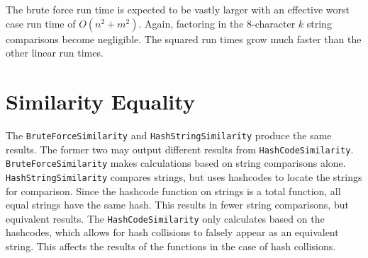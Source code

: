 \documentclass[10pt,letterpaper]{article}
\begin{document}
The brute force run time is expected to be vastly larger with an effective worst case run time of $O(n^2+m^2)$. Again, factoring in the 8-character $k$ string comparisons become negligible. The squared run times grow much faster than the other linear run times.
\section{Similarity Equality}
The \texttt{BruteForceSimilarity} and \texttt{HashStringSimilarity} produce the
same results. The former two may output different results from
\texttt{HashCodeSimilarity}. \texttt{BruteForceSimilarity} makes calculations
based on string comparisons alone. \texttt{HashStringSimilarity} compares
strings, but uses hashcodes to locate the strings for comparison. Since the
hashcode function on strings is a total function, all equal strings have the
same hash. This results in fewer string comparisons, but equivalent results. The
\texttt{HashCodeSimilarity} only calculates based on the hashcodes, which allows
for hash collisions to falsely appear as an equivalent string. This affects the
results of the functions in the case of hash collisions.
\end{document}
